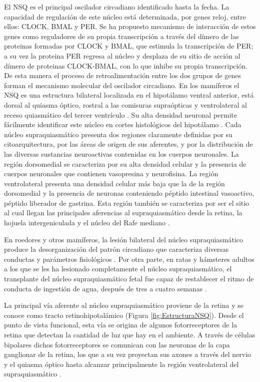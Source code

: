 \documentclass[12pt,letterpaper,final]{article}
\let\cite\cite %
\begin{document}
El NSQ es el principal oscilador circadiano identificado hasta la fecha. La capacidad de regulación de este núcleo está determinada, por genes reloj, entre ellos: CLOCK, BMAL y PER. Se ha propuesto mecanismo de interacción de estos genes como reguladores de su propia transcripción a través del dímero de las proteinas formadas por CLOCK y BMAL, que estimula la transcripción de PER; a su vez la proteina PER regresa al núcleo y desplaza de su sitio de acción al dímero de proteinas CLOCK-BMAL, con lo que inhibe su propia transcripción. De esta manera el proceso de retroalimentación entre los dos grupos de genes forman el mecanismo molecular del oscilador circadiano. En los mamíferos el NSQ es una estructura bilateral localizada en el hipotálamo ventral anterior, está dorsal al quiasma óptico, rostral a las comisuras supraópticas y ventrolateral al receso quiasmático del tercer ventrículo \cite{golombek2007}.
Su alta densidad neuronal permite fácilmente identificar este núcleo en cortes histológicos del hipotálamo \cite{VandenPol1991}.
Cada núcleo supraquiasmático presenta dos regiones claramente definidas por su citoarquitectura, por las áreas de origen de sus aferentes, y por la distribución de las diversas sustancias neuroactivas contenidas en los cuerpos neuronales. La región dorsomedial se caracteriza por su alta densidad celular y la presencia de cuerpos neuronales que contienen vasopresina
y neurofisina. La región ventrolateral presenta una densidad celular más baja que la de la región dorsomedial y la presencia de neuronas conteniendo péptido intestinal vasoactivo, péptido liberador de gastrina. Esta región también se caracteriza por ser el sitio al cual llegan las principales aferencias al supraquiasmático desde la retina, la hojuela intergeniculada y el núcleo del Rafe mediano \cite{VandenPol1991}.

En roedores y otros mamíferos, la lesión bilateral del núcleo supraquiasmático produce la desorganización del patrón circadiano que caracteriza diversas conductas y parámetros fisiológicos \cite{Aguilar-Roblero1987}. Por otra parte, en ratas y hámsteres adultos a los que se les ha lesionado completamente el núcleo supraquiasmático, el transplante del núcleo supraquiasmático fetal fue capaz de restablecer el ritmo de conducta de ingestión de agua, después de tres a cuatro semanas \cite{Drucker-Colin1984}.

La principal vía aferente al núcleo supraquiasmático proviene de la retina y se conoce como tracto retinohipotalámico (Figura \ref{fig:EstructuraNSQ}). Desde el punto de vista funcional, esta vía se origina de algunos fotorreceptores de la retina que detectan la cantidad de luz que hay en el ambiente. A través de células bipolares dichos fotorreceptores se comunican con las neuronas de la capa ganglionar de la retina, los que a su vez proyectan sus axones a través del nervio y el quiasma óptico hasta alcanzar principalmente la región ventrolateral del supraquiasmático \cite{Moore1972}.
\end{document}
